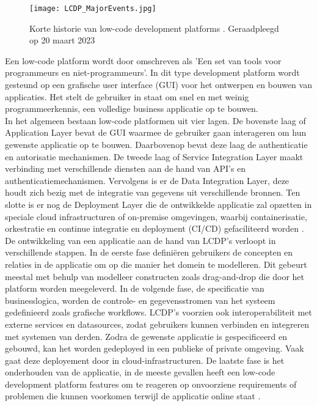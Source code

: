 \begin{figure}
    \centering
    \texttt{[image: LCDP\_MajorEvents.jpg]}
    \caption{Korte historie van low-code development platforms \autocite{Ruscio2022}. Geraadpleegd op 20 maart 2023}
    \label{fig:lcdp_history}
\end{figure}

Een low-code platform wordt door \textcite{Waszkowski2019} omschreven als 'Een set van tools voor programmeurs en niet-programmeurs'. In dit type development platform wordt gesteund op een grafische user interface (GUI) voor het ontwerpen en bouwen van applicaties. Het stelt de gebruiker in staat om snel en met weinig programmeerkennis, een volledige business applicatie op te bouwen. \\

In het algemeen bestaan low-code platformen uit vier lagen. De bovenste laag of Application Layer bevat de GUI waarmee de gebruiker gaan interageren om hun gewenste applicatie op te bouwen. Daarbovenop bevat deze laag de authenticatie en autorisatie mechanismen. De tweede laag of Service Integration Layer maakt verbinding met verschillende diensten aan de hand van API's en authenticatiemechanismen. Vervolgens is er de Data Integration Layer, deze houdt zich bezig met de integratie van gegevens uit verschillende bronnen. Ten slotte is er nog de Deployment Layer die de ontwikkelde applicatie zal opzetten in speciale cloud infrastructuren of on-premise omgevingen, waarbij containerisatie, orkestratie en continue integratie en deployment (CI/CD) gefaciliteerd worden \autocite{Sahay2020}. \\

De ontwikkeling van een applicatie aan de hand van LCDP's verloopt in verschillende stappen. In de eerste fase definiëren gebruikers de concepten en relaties in de applicatie om op die manier het domein te modelleren. Dit gebeurt meestal met behulp van modelleer constructen zoals drag-and-drop die door het platform worden meegeleverd. In de volgende fase, de specificatie van businesslogica, worden de controle- en gegevensstromen van het systeem gedefinieerd zoals grafische workflows. LCDP's voorzien ook interoperabiliteit met externe services en datasources, zodat gebruikers kunnen verbinden en integreren met systemen van derden. Zodra de gewenste applicatie is gespecificeerd en gebouwd, kan het worden gedeployed in een publieke of private omgeving. Vaak gaat deze deployement door in cloud-infrastructuren. De laatste fase is het onderhouden van de applicatie, in de meeste gevallen heeft een low-code development platform features om te reageren op onvoorziene requirements of problemen die kunnen voorkomen terwijl de applicatie online staat \autocite{Ruscio2022}. \\


